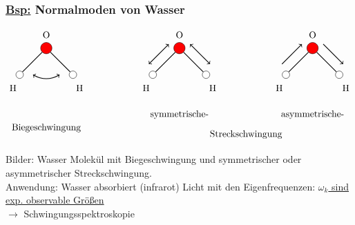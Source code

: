 \documentclass[titlepage,12pt,a4paper,ngerman]{report}
\begin{document}
{\subsubsection{\underline{Bsp:} Normalmoden von Wasser}
$$
\begin{tikzpicture}
\node[circle,fill=red, draw=black,inner sep=1.5mm] (a) at (0,0) {};
\node[circle,fill=red, draw=black,inner sep=1.5mm] (b) at (5,0) {};
\node[circle,fill=red, draw=black,inner sep=1.5mm] (c) at (10,0) {};
\node[circle,fill=white, draw=black, inner sep=1mm] (a1) at (-1,-1) {};
\node[circle,fill=white, draw=black, inner sep=1mm] (a2) at (1,-1) {};
\node[circle,fill=white, draw=black, inner sep=1mm] (b1) at (4,-1) {};
\node[circle,fill=white, draw=black, inner sep=1mm] (b2) at (6,-1) {};
\node[circle,fill=white, draw=black, inner sep=1mm] (c1) at (9,-1) {};
\node[circle,fill=white, draw=black, inner sep=1mm] (c2) at (11,-1) {};
\draw[thick,-] (a1) -- (a);
\draw[thick,-] (a2) -- (a);
\draw[thick,-] (b1) -- (b);
\draw[thick,-] (b2) -- (b);
\draw[thick,-] (c1) -- (c);
\draw[thick,-] (c2) -- (c);
\node at (0,.5) {O};
\node at (-1.25,-1.5) {H};
\node at (1.25,-1.5) {H};
\node at (5,.5) {O};
\node at (5-1.25,-1.5) {H};
\node at (5+1.25,-1.5) {H};
\node at (10,.5) {O};
\node at (10-1.25,-1.5) {H};
\node at (11.25,-1.5) {H};
\draw [<->,black,thick] (0.5,-1) to [out=-150,in=-30] (-0.5,-1);
\draw [<->,black,thick] (5-0.25-.15,0+.15) to (4-.15,-1+0.25+.15);
\draw [<->,black,thick] (5+0.25+.15,0+.15) to (6+.15,-1+0.25+.15);
\draw [<-,black,thick] (10-0.25-.15,0+.15) to (9-.15,-1+0.25+.15);
\draw [->,black,thick] (10+0.25+.15,0+.15) to (11+.15,-1+0.25+.15);
\node at (0,-3) {Biegeschwingung};
\node at (5,-2.5) {symmetrische-};
\node at (10,-2.5) {asymmetrische-};
\node at (7.5,-3.25) {Streckschwingung};
\end{tikzpicture}
$$

\noindent
Bilder: Wasser Molekül mit Biegeschwingung und symmetrischer oder asymmetrischer Streckschwingung.\\[5pt]
Anwendung: Wasser absorbiert (infrarot) Licht mit den Eigenfrequenzen: \underline{$\omega_k$ sind exp. observable Größen}\\
$\rightarrow$ Schwingungsspektroskopie




}
\end{document}
